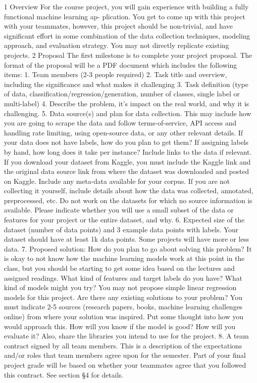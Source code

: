 \documentclass[12pt]{article}
\begin{document}
1 Overview
For the course project, you will gain experience with building a fully functional machine learning ap-
plication. You get to come up with this project with your teammates, however, this project should
be non-trivial, and have significant effort in some combination of the data collection techniques,
modeling approach, and evaluation strategy. You may not directly replicate existing projects.
2 Proposal
The first milestone is to complete your project proposal. The format of the proposal will be a PDF
document which includes the following items:
1. Team members (2-3 people required)
2. Task title and overview, including the significance and what makes it challenging
3. Task definition (type of data, classification/regression/generation, number of classes, single
label or multi-label)
4. Describe the problem, it’s impact on the real world, and why it is challenging.
5. Data source(s) and plan for data collection. This may include how you are going to scrape the
data and follow terms-of-service, API access and handling rate limiting, using open-source
data, or any other relevant details. If your data does not have labels, how do you plan to
get them? If assigning labels by hand, how long does it take per instance? Include links to
the data if relevant. If you download your dataset from Kaggle, you must include the Kaggle
link and the original data source link from where the dataset was downloaded and posted on
Kaggle. Include any meta-data available for your corpus. If you are not collecting it yourself,
include details about how the data was collected, annotated, preprocessed, etc. Do not work
on the datasets for which no source information is available. Please indicate whether you will
use a small subset of the data or features for your project or the entire dataset, and why.
6. Expected size of the dataset (number of data points) and 3 example data points with labels.
Your dataset should have at least 1k data points. Some projects will have more or less data.
7. Proposed solution: How do you plan to go about solving this problem? It is okay to not know
how the machine learning models work at this point in the class, but you should be starting
to get some idea based on the lectures and assigned readings. What kind of features and
target labels do you have? What kind of models might you try? You may not propose simple
linear regression models for this project. Are there any existing solutions to your problem?
You must indicate 2-5 sources (research papers, books, machine learning challenges online)
from where your solution was inspired. Put some thought into how you would approach this.
How will you know if the model is good? How will you evaluate it? Also, share the libraries
you intend to use for the project.
8. A team contract signed by all team members. This is a description of the expectations
and/or roles that team members agree upon for the semester. Part of your final project grade
will be based on whether your teammates agree that you followed this contract. See section
§4 for details.
\end{document}
